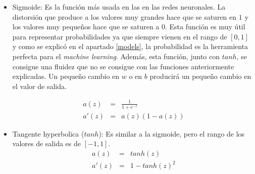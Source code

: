 \begin{itemize}
\item Sigmoide: Es la función más usada en las en las redes neuronales. La distorsión que produce a los valores muy grandes hace que se saturen en $1$ y los valores muy pequeños hace que se saturen a $0$. Esta función es muy útil para representar probabilidades ya que siempre vienen en el rango de $[0, 1]$ y como se explicó en el apartado \ref{models}, la probabilidad es la herramienta perfecta para el \textit{machine learning}. Además, esta función, junto con $tanh$, se consigue una fluidez que no se consigue con las funciones anteriormente explicadas. Un pequeño cambio en $w$ o en $b$ producirá un pequeño cambio en el valor de salida.

\begin{eqnarray}
    a(z) & = & \frac{\mathrm{1} }{\mathrm{1} + e^{-z} } \\
    a'(z) & = & a(z) (1 - a(z))
\end{eqnarray}

\item Tangente hyperbolica ($tanh$): Es similar a la sigmoide, pero el rango de los valores de salida es de $[-1,1]$.
\begin{eqnarray}
    a(z) & = & tanh(z) \\
    a'(z) & = & 1 - tanh(z)^2
\end{eqnarray}



\end{itemize}

